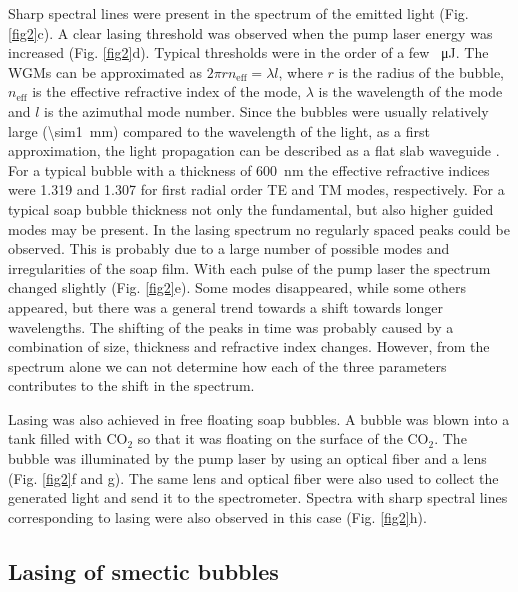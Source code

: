 \documentclass[a4paper,12pt]{article}
\begin{document}
	
	Sharp spectral lines were present in the spectrum of the emitted light (Fig. \ref{fig2}c). A clear lasing threshold was observed when the pump laser energy was increased (Fig. \ref{fig2}d). Typical thresholds were in the order of a few \SI{}{\micro J}.  The WGMs can be approximated as $2\pi r n_{\mathrm{eff}}= \lambda l$, where $r$ is the radius of the bubble, $n_{\mathrm{eff}}$ is the effective refractive index of the mode, $\lambda$ is the wavelength of the mode and $l$ is the azimuthal mode number. Since the bubbles were usually relatively large (\SI{\sim1}{mm}) compared to the wavelength of the light, as a first approximation, the light propagation can be described as a flat slab waveguide \cite{kawano2004introduction}. For a typical bubble with a thickness of \SI{600}{nm} the effective refractive indices were 1.319 and 1.307 for first radial order TE and TM modes, respectively. For a typical soap bubble thickness not only the fundamental, but also higher guided modes may be present. In the lasing spectrum no regularly spaced peaks could be observed. This is probably due to a large number of possible modes and irregularities of the soap film. With each pulse of the pump laser the spectrum changed slightly (Fig. \ref{fig2}e). Some modes disappeared, while some others appeared, but there was a general trend towards a shift towards longer wavelengths. The shifting of the peaks in time was probably caused by a combination of size, thickness and refractive index changes. However, from the spectrum alone we can not determine how each of the three parameters contributes to the shift in the spectrum.
	
	Lasing was also achieved in free floating soap bubbles. A bubble was blown into a tank filled with CO$_2$ so that it was floating on the surface of the CO$_2$. The bubble was illuminated by the pump laser by using an optical fiber and a lens (Fig. \ref{fig2}f and g). The same lens and optical fiber were also used to collect the generated light and send it to the spectrometer. Spectra with sharp spectral lines corresponding to lasing were also observed in this case (Fig. \ref{fig2}h).
	
	
	\subsection*{Lasing of smectic bubbles}
	
\end{document}
